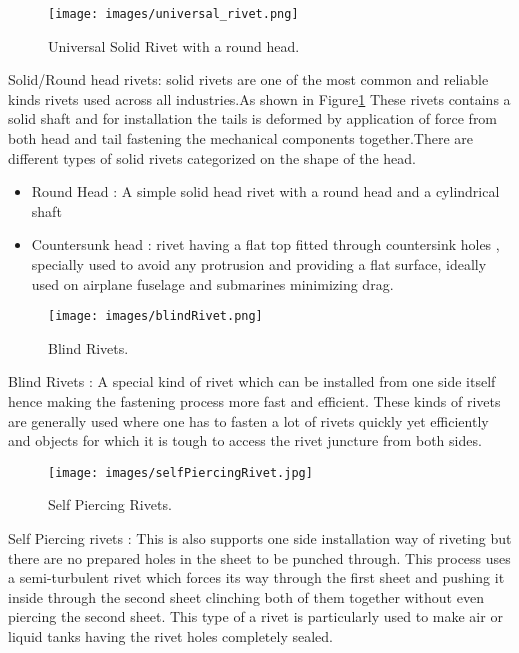 \documentclass{article}
\begin{document}
\begin{figure}[htp]
    \centering
    \texttt{[image: images/universal\_rivet.png]}
    \caption{Universal Solid Rivet with a round head.}
    \label{fig: SolidRoundHeadRivet}
\end{figure} 

Solid/Round head rivets: solid rivets are one of the most common and reliable kinds rivets used across all industries.As shown in Figure\ref{fig: SolidRoundHeadRivet} These rivets contains a solid shaft and for installation the tails is deformed by application of force from both head and tail fastening the mechanical components together.There are different types of solid rivets categorized on the shape of the head.   
    
    \begin{itemize}
        \item Round Head : A simple solid head rivet with a round head and a cylindrical shaft
        \item Countersunk head : rivet having a flat top fitted through countersink holes , specially used to avoid any protrusion and providing a flat surface, ideally used on airplane fuselage and submarines minimizing drag.
    \end{itemize}
   
   
\begin{figure}[H]
    \centering
    \texttt{[image: images/blindRivet.png]}
    \caption{Blind Rivets.}
    \label{fig: blindRivet}
\end{figure}

Blind Rivets : A special kind of rivet which can be installed from one side itself hence making the fastening process more fast and efficient. These kinds of rivets are generally used where one has to fasten a lot of rivets quickly yet efficiently and objects for which it is tough to access the rivet juncture from both sides.
\begin{figure}[htp]
    \centering
    \texttt{[image: images/selfPiercingRivet.jpg]}
    \caption{Self Piercing Rivets.}
    \label{fig: blindRivet}
\end{figure}

Self Piercing rivets : This is also supports one side installation way of riveting but there are no prepared holes in the sheet to be punched through. This process uses a semi-turbulent rivet which forces its way through the first sheet and pushing it inside through the second sheet clinching both of them together without even piercing the second sheet. This type of a rivet is particularly used to make air or liquid tanks having the rivet holes completely sealed.  
\end{document}
